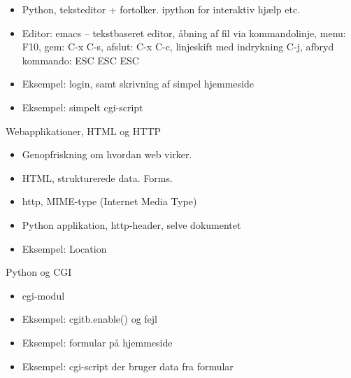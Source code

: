 \documentclass[a4paper,landscape]{slides}
\begin{document}
\begin{slide}
	\begin{center} {\large 
	} \end{center}
	\begin{itemize} \addtolength{\itemsep}{-\baselineskip}
                \item Python, teksteditor + fortolker. ipython for interaktiv hjælp etc.
                \item Editor: emacs -- tekstbaseret editor, åbning af fil via kommandolinje, menu: F10, gem: C-x C-s, afslut: C-x C-c, linjeskift med indrykning C-j, afbryd kommando: ESC ESC ESC
                \item Eksempel: login, samt skrivning af simpel hjemmeside
                \item Eksempel: simpelt cgi-script
	\end{itemize}
\end{slide}

\begin{slide}
	\begin{center} {\large 
            Webapplikationer, HTML og HTTP
	} \end{center}
	\begin{itemize} \addtolength{\itemsep}{-\baselineskip}
                \item Genopfriskning om hvordan web virker.
                \item HTML, strukturerede data. Forms.
                \item http, MIME-type (Internet Media Type)
                \item Python applikation, http-header, selve dokumentet
                \item Eksempel: Location
	\end{itemize}
\end{slide}


\begin{slide}
	\begin{center} {\large 
            Python og CGI
	} \end{center}
	\begin{itemize} \addtolength{\itemsep}{-\baselineskip}
                \item cgi-modul
                \item Eksempel: cgitb.enable() og fejl
                \item Eksempel: formular på hjemmeside
                \item Eksempel: cgi-script der bruger data fra formular
	\end{itemize}
\end{slide}
\end{document}
